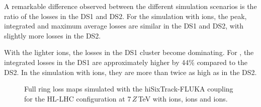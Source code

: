 A remarkable difference observed between the different simulation scenarios is the ratio of the losses in the DS1 and DS2. For the simulation with \lead ions, the peak, integrated and maximum average losses are similar in the DS1 and DS2, with slightly more losses in the DS2. 


With the lighter ions, the losses in the DS1 cluster become dominating. For , the integrated losses in the DS1 are approximately higher by 44\% compared to the DS2. In the simulation with  ions, they are more than twice as high as in the DS2.




\begin{figure}[htbp]
  \centering
  \caption{Full ring loss maps simulated with the hiSixTrack-FLUKA coupling for the HL-LHC configuration at 7$\,Z\,$TeV with \lead ions,  ions and  ions.}  
  \label{pic:16072602}
  \end{figure}


